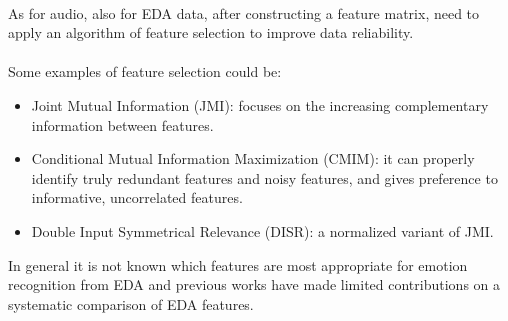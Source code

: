 \\ \indent
As for audio, also for EDA data, after constructing a feature matrix, need to apply an algorithm of feature selection to improve data reliability.
\\ \\
Some examples of feature selection could be:
\begin{itemize}
	\item Joint Mutual Information (JMI): focuses on the increasing complementary information between features.
	\item Conditional Mutual Information Maximization (CMIM): it can properly identify truly redundant features and noisy features, and gives preference to informative, uncorrelated features.
	\item Double Input Symmetrical Relevance (DISR): a normalized variant of JMI.
\end{itemize}
In general it is not known which features are most appropriate for emotion recognition from EDA and previous works have made limited contributions on a systematic comparison of EDA features.






